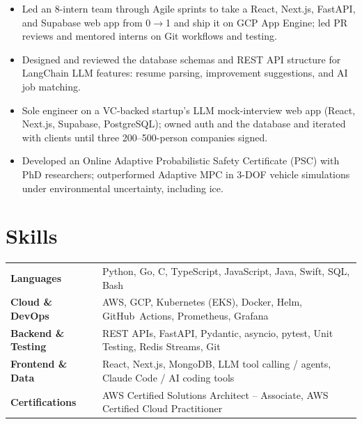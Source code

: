 \documentclass[11pt, letterpaper]{article}
\begin{document}
\begin{itemize}
  \item Led an 8-intern team through Agile sprints to take a React, Next.js, FastAPI, and Supabase web app from 0$\to$1 and ship it on GCP App Engine; led PR reviews and mentored interns on Git workflows and testing.
  \item Designed and reviewed the database schemas and REST API structure for LangChain LLM features: resume parsing, improvement suggestions, and AI job matching.
\end{itemize}

\begin{itemize}
  \item Sole engineer on a VC-backed startup's LLM mock-interview web app (React, Next.js, Supabase, PostgreSQL); owned auth and the database and iterated with clients until three 200--500-person companies signed.
\end{itemize}

\begin{itemize}
  \item Developed an Online Adaptive Probabilistic Safety Certificate (PSC) with PhD researchers; outperformed Adaptive MPC in 3-DOF vehicle simulations under environmental uncertainty, including ice.
\end{itemize}

\section{Skills}
\begin{tabularx}{\textwidth}{@{}l @{\hspace{7pt}} >{\raggedright\arraybackslash}X@{}}
  \textbf{Languages} & Python, Go, C, TypeScript, JavaScript, Java, Swift, SQL, Bash \\[1pt]
  \textbf{Cloud \& DevOps} & AWS, GCP, Kubernetes (EKS), Docker, Helm, GitHub~Actions, Prometheus, Grafana \\[1pt]
  \textbf{Backend \& Testing} & REST APIs, FastAPI, Pydantic, asyncio, pytest, Unit Testing, Redis Streams, Git \\[1pt]
  \textbf{Frontend \& Data} & React, Next.js, MongoDB, LLM tool calling / agents, Claude Code / AI coding tools \\[1pt]
  \textbf{Certifications} & AWS Certified Solutions Architect -- Associate, AWS Certified Cloud Practitioner \\
\end{tabularx}
\end{document}
